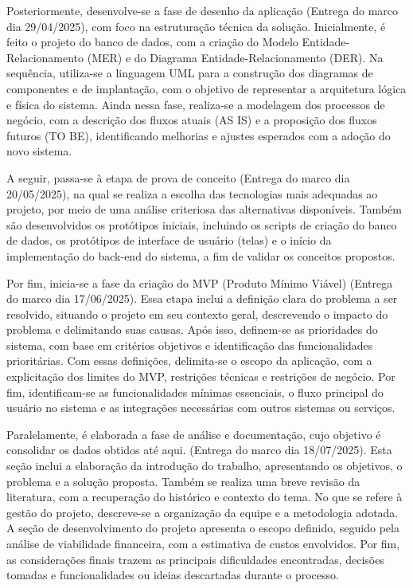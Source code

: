 \documentclass[
	12pt,				%
	openright,			%
	twoside,			%
	a4paper,			%
	english,			%
	french,				%
	spanish,			%
	brazil				%
	]{abntex2}
\begin{document}
Posteriormente, desenvolve-se a fase de desenho da aplicação (Entrega do marco dia 29/04/2025), com foco na estruturação técnica da solução. Inicialmente, é feito o projeto do banco de dados, com a criação do Modelo Entidade-Relacionamento (MER) e do Diagrama Entidade-Relacionamento (DER). Na sequência, utiliza-se a linguagem UML para a construção dos diagramas de componentes e de implantação, com o objetivo de representar a arquitetura lógica e física do sistema. Ainda nessa fase, realiza-se a modelagem dos processos de negócio, com a descrição dos fluxos atuais (AS IS) e a proposição dos fluxos futuros (TO BE), identificando melhorias e ajustes esperados com a adoção do novo sistema.

A seguir, passa-se à etapa de prova de conceito (Entrega do marco dia 20/05/2025), na qual se realiza a escolha das tecnologias mais adequadas ao projeto, por meio de uma análise criteriosa das alternativas disponíveis. Também são desenvolvidos os protótipos iniciais, incluindo os scripts de criação do banco de dados, os protótipos de interface de usuário (telas) e o início da implementação do back-end do sistema, a fim de validar os conceitos propostos.

Por fim, inicia-se a fase da criação do MVP (Produto Mínimo Viável) (Entrega do marco dia 17/06/2025). Essa etapa inclui a definição clara do problema a ser resolvido, situando o projeto em seu contexto geral, descrevendo o impacto do problema e delimitando suas causas. Após isso, definem-se as prioridades do sistema, com base em critérios objetivos e identificação das funcionalidades prioritárias. Com essas definições, delimita-se o escopo da aplicação, com a explicitação dos limites do MVP, restrições técnicas e restrições de negócio. Por fim, identificam-se as funcionalidades mínimas essenciais, o fluxo principal do usuário no sistema e as integrações necessárias com outros sistemas ou serviços.

Paralelamente, é elaborada a fase de análise e documentação, cujo objetivo é consolidar os dados obtidos até aqui. (Entrega do marco dia 18/07/2025). Esta seção inclui a elaboração da introdução do trabalho, apresentando os objetivos, o problema e a solução proposta. Também se realiza uma breve revisão da literatura, com a recuperação do histórico e contexto do tema. No que se refere à gestão do projeto, descreve-se a organização da equipe e a metodologia adotada. A seção de desenvolvimento do projeto apresenta o escopo definido, seguido pela análise de viabilidade financeira, com a estimativa de custos envolvidos. Por fim, as considerações finais trazem as principais dificuldades encontradas, decisões tomadas e funcionalidades ou ideias descartadas durante o processo.
\end{document}
